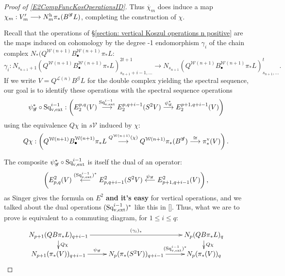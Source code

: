 \documentclass[11pt]{amsart}
\theoremstyle{plain}
\theoremstyle{definition}
\renewcommand{\to}{\longrightarrow}
\newcommand{\from}{\longleftarrow}
\newcommand{\scrG}{\mathscr{G}}
\newcommand{\calW}{\mathcal{W}}
\newcommand{\calL}{\mathcal{L}}
\newcommand{\calV}{\mathcal{V}}
\theoremstyle{plain}
\newcommand{\BSW}{{\scrG}}
\newcommand{\BSWres}{B^\BSW}%
\newcommand{\vExtCohOp}{\textup{Sq}_\textup{v,ext}}
\begin{document}
\begin{Operations in composite functor spectral sequences}
\begin{proof}[Proof of \ref{E2CompFuncKosOperationsID}]
Thus $\overline{\chi}_m$ does induce a map $\chi_m:V'_m\to N_m^\textup{h}\pi_*(\BSWres L)$, completing the construction of $\chi$.






Recall that the operations of \S\ref{section: vertical Koszul operations n positive} are the maps induced on cohomology by the degree -1 endomorphism $\gamma_i$ of the chain complex $N_*(Q^{\calW(n+1)} B^{\calW(n+1)}_{\bullet}\pi_*L$:
\[\gamma_i:N_{s_{n+1}+1}(Q^{\calW(n+1)} B^{\calW(n+1)}_{\bullet}\pi_*L)^{2t+1}_{s_{n+1}+i-1,\ldots}\to N_{s_{n+1}}(Q^{\calW(n+1)} B^{\calW(n+1)}_{\bullet}\pi_*L)^{t}_{s_{n+1},\ldots}.\]
If we write $V=Q^{\calL(n)}\BSWres L$ for the double complex yielding the spectral sequence, our goal is to identify these operations with the spectral sequence operations
\[\psi_{\BSW}^*\circ\vExtCohOp^{i-1}:\left(E^{p,q}_2(V)\overset{\vExtCohOp^{i-1}}{\to} E^{p,q+i-1}_2(S^2V)\overset{\psi_{\BSW}^*}{\to}E^{p+1,q+i-1}_2(V)\right)\]
using the equivalence $Q\chi$ in $s\calV$ induced by $\chi$:%
\[Q\chi:\left(Q^{\calW(n+1)}B^{\calW(n+1)}_{\bullet} \pi_*L\overset{Q^{\calW(n+1)}(\chi)}{\to} Q^{\calW(n+1)}\pi_*(\BSWres )\overset{\cong }{\to}\pi_*^\textup{v}(V)\right).\]

The composite $\psi_{\BSW}^*\circ\vExtCohOp^{i-1}$ is itself the dual of an operator:
\[\left(E_{p,q}^2(V)\overset{(\vExtCohOp^{i-1})^*}{\from} E_{p,q+i-1}^2(S^2V)\overset{\psi_{\BSW}}{\from}E_{p+1,q+i-1}^2(V)\right),\]
as Singer gives the formula on $E^2$ \textbf{and it's easy} for vertical operations, and we talked about the dual operations $(\vExtCohOp^{i-1})^*$ like this in []. Thus, what we are to prove is equivalent to a commuting diagram, for $1\leq i\leq q$:
\[\xymatrix@R=4mm{
N_{p+1}(QB\pi_*L)_{q+i-1}\ar[rr]^-{(\gamma_i)_*}
\ar[d]^-{Q\chi}
&%
&%
N_p(QB\pi_*L)_q\ar[d]^-{Q\chi}
\\%
N_{p+1}(\pi_*(V))_{q+i-1}\ar[r]^-{\psi_{\BSW}}
&%
N_{p}(\pi_*(S^2V))_{q+i-1}\ar[r]^-{(\vExtCohOp^{i-1})^*}
&%
N_p(\pi_*(V))_q%
}\]


\end{proof}
\end{Operations in composite functor spectral sequences}
\end{document}
